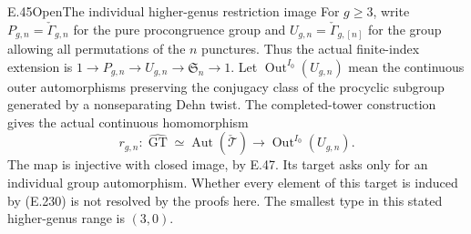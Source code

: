 \begin{result}{E.45}{Open}{The individual higher-genus restriction image}
For $g\geq3$, write
$P_{g,n}=\check\Gamma_{g,n}$ for the pure
procongruence group and
$U_{g,n}=\check\Gamma_{g,[n]}$ for the group
allowing all permutations of the $n$ punctures.
Thus the actual finite-index extension is
$1\to P_{g,n}\to U_{g,n}\to\mathfrak S_n\to1$.
Let $\operatorname{Out}^{I_0}(U_{g,n})$ mean
the continuous outer automorphisms preserving
the conjugacy class of the procyclic subgroup
generated by a nonseparating Dehn twist.
The completed-tower construction gives the actual
continuous homomorphism
\[
 r_{g,n}:\widehat{\operatorname{GT}}
   \simeq\operatorname{Aut}(\check{\mathcal T})
   \longrightarrow\operatorname{Out}^{I_0}(U_{g,n}).
                                                               \tag{E.230}
\]
The map is injective with closed image, by E.47.
Its target asks only for an individual group
automorphism. Whether every element of this
target is induced by (E.230) is not resolved
by the proofs here.
The smallest type in this stated higher-genus
range is $(3,0)$.
\end{result}

